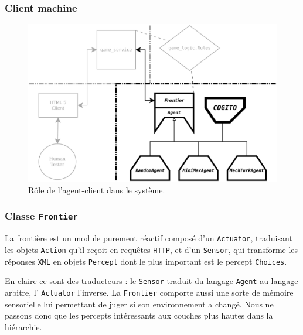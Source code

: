 \subsubsection{Client machine}

\begin{figure}[H] 
\centering
\includegraphics[width=\textwidth]{files/william/archi_client_machine} 
\caption{Rôle de l'agent-client dans le système.} 
\end{figure}

\subsubsection{Classe \texttt{Frontier}}
La frontière est un module purement réactif composé d'un \texttt{Actuator}, traduisant les objets \texttt{Action} qu'il reçoit en requêtes \texttt{HTTP}, et d'un \texttt{Sensor}, qui transforme les réponses \texttt{XML} en objets \texttt{Percept} dont le plus important est le percept \texttt{Choices}.

En claire ce sont des traducteurs : le \texttt{Sensor} traduit du langage \texttt{Agent} au langage arbitre, l' \texttt{Actuator} l'inverse. La \texttt{Frontier} comporte aussi une sorte de mémoire sensorielle lui permettant de juger si son environnement a changé. Nous ne passons donc que les percepts intéressants aux couches plus hautes dans la hiérarchie.  

